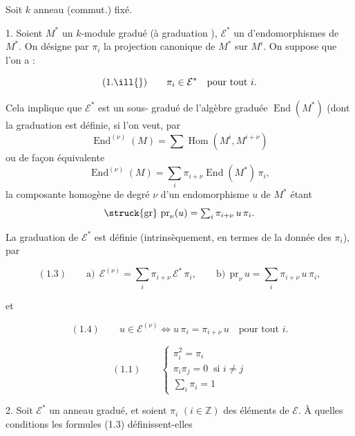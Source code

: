 
Soit $k$ anneau (commut.) fixé.

1. Soient  $M^{*}$ un $k$-module gradué (à graduation
\ill{}), $\mathcal{E}^{*}$ un   d'endomorphismes de $M^{*}$. On désigne par $\pi_{i}$ la projection
canonique de $M^{*}$ sur $M^{i}$.  On suppose que l'on a :

\[ (1.\ill{}) \qquad \pi_{i} \in \mathcal{E}^{*} \quad \text{pour tout } i . \]


Cela implique que $\mathcal{E}^{*}$ est un sous-
 gradué de l'algèbre graduée 
$\operatorname{End}(M^{*})$ (dont la graduation est définie, si l'on veut, par
\[ \operatorname{End}^{(\nu)}(M) = \textstyle\sum \operatorname{Hom}(M^{i}, M^{i+\nu}) \]
ou de façon équivalente
\[ \operatorname{End}^{(\nu)}(M) = \textstyle\sum_{i} \pi_{i+\nu} \operatorname{End}(M^{*})\, \pi_{i} , \]
la composante homogène de degré $\nu$ d'un endomorphisme $u$ de $M^{*}$ étant
\[ \struck{\mathrm{gr}}\ \mathrm{pr}_{\nu}(u) = \textstyle\sum_{i} \pi_{i+\nu}\, u\, \pi_{i} . \]

La graduation de $\mathcal{E}^{*}$ est définie (intrinsèquement, en termes de la
donnée des $\pi_{i}$), par

\[ (1.3) \qquad \text{a)}\ \ \mathcal{E}^{(\nu)} = \sum_{i} \pi_{i+\nu}\, \mathcal{E}^{*}\, \pi_{i} , \qquad \text{b)}\ \ \mathrm{pr}_{\nu}\, u = \sum_{i} \pi_{i+\nu}\, u\, \pi_{i} , \]

et

\[ (1.4) \qquad u \in \mathcal{E}^{(\nu)} \iff u\, \pi_{i} = \pi_{i+\nu}\, u \quad \text{pour tout } i . \]


\[ (1.1) \qquad \begin{cases} \pi_{i}^{2} = \pi_{i} \\ \pi_{i} \pi_{j} = 0 \ \text{ si } i \neq j \\ \sum_{i} \pi_{i} = 1 \end{cases} \]

2. Soit $\mathcal{E}^{*}$ un  anneau gradué, et soient
$\pi_{i}$ $(i \in \mathbb{Z})$  des éléments de
$\mathcal{E}$. À quelles conditions les formules (1.3) définissent-elles

